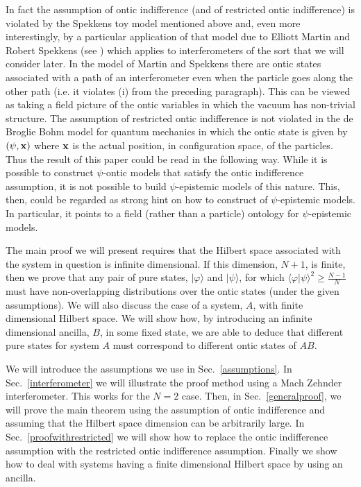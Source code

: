\documentclass[12pt]{article}
\begin{document}
In fact the assumption of ontic indifference (and of restricted ontic indifference) is violated by the Spekkens toy model mentioned above and, even more interestingly, by a particular application of that model due to Elliott Martin and Robert Spekkens (see \cite{spekkens2008why}) which applies to interferometers of the sort that we will consider later.  In the model of Martin and Spekkens there are ontic states associated with a path of an interferometer even when the particle goes along the other path (i.e. it violates (i) from the preceding paragraph).  This can be viewed as taking a field picture of the ontic variables in which the vacuum has non-trivial structure.  The assumption of restricted ontic indifference is not violated in the de Broglie Bohm model for quantum mechanics in which the ontic state is given by $(\psi, {\bf x})$ where $\bf x$ is the actual position, in configuration space, of the particles.  Thus the result of this paper could be read in the following way.  While it is possible to construct $\psi$-ontic models that satisfy the ontic indifference assumption, it is not possible to build $\psi$-epistemic models of this nature.  This, then, could be regarded as strong hint on how to construct of $\psi$-epistemic models.  In particular, it points to a field (rather than a particle) ontology for $\psi$-epistemic models.  

The main proof we will present requires that the Hilbert space associated with the system in question is infinite dimensional.   If this dimension, $N+1$, is finite, then we prove that any
pair of pure states, $|\varphi\rangle$ and $|\psi\rangle$, for which $\langle \varphi| \psi\rangle^2 \geq \frac{N-1}{N}$ must have non-overlapping distributions over the ontic states (under the given assumptions).   We
will also discuss the case of a system, $A$, with finite dimensional Hilbert space.  We will show how, by introducing an infinite dimensional ancilla, $B$, in some fixed state, we are able
to deduce that different pure states for system $A$ must correspond to different ontic states of $AB$.

We will introduce the assumptions we use in Sec.\ \ref{assumptions}.   In Sec.\ \ref{interferometer} we will illustrate the proof method using a Mach Zehnder interferometer.  This works for
the $N=2$ case.  Then, in Sec.\ \ref{generalproof}, we will prove the main theorem using the assumption of ontic indifference and assuming that the Hilbert space dimension can be arbitrarily
large.  In Sec.\ \ref{proofwithrestricted} we will show how to replace the ontic indifference assumption with the restricted ontic indifference assumption.  Finally we show how to deal with
systems having a finite dimensional Hilbert space by using an ancilla.
\end{document}
